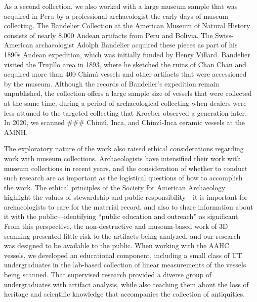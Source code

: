 \documentclass[]{interact}
\theoremstyle{plain}%
\theoremstyle{definition}
\theoremstyle{remark}
\begin{document}
As a second collection, we also worked with a large museum sample that
was acquired in Peru by a professional archaeologist the early days of
museum collecting. The Bandelier Collection at the American Museum of
Natural History consists of nearly 8,000 Andean artifacts from Peru and
Bolivia. The Swiss-American archaeologist Adolph Bandelier acquired
these pieces as part of his 1890s Andean expedition, which was initially
funded by Henry Villard. Bandelier visited the Trujillo area in 1893,
where he sketched the ruins of Chan Chan and acquired more than 400
Chimú vessels and other artifacts that were accessioned by the museum.
Although the records of Bandelier's expedition remain unpublished, the
collection offers a large sample size of vessels that were collected at
the same time, during a period of archaeological collecting when dealers
were less attuned to the targeted collecting that Kroeber observed a
generation later. In 2020, we scanned \#\#\# Chimú, Inca, and Chimú-Inca
ceramic vessels at the AMNH.

The exploratory nature of the work also raised ethical considerations
regarding work with museum collections. Archaeologists have intensified
their work with museum collections in recent years, and the
consideration of whether to conduct such research are as important as
the logistical questions of how to accomplish the work. The ethical
principles of the Society for American Archaeology highlight the values
of stewardship and public responsibility---it is important for
archaeologists to care for the material record, and also to share
information about it with the public---identifying ``public education
and outreach'' as significant. From this perspective, the
non-destructive and museum-based work of 3D scanning presented little
risk to the artifacts being analyzed, and our research was designed to
be available to the public. When working with the AAHC vessels, we
developed an educational component, including a small class of UT
undergraduates in the lab-based collection of linear measurements of the
vessels being scanned. That supervised research provided a diverse group
of undergraduates with artifact analysis, while also teaching them about
the loss of heritage and scientific knowledge that accompanies the
collection of antiquities.
\end{document}
